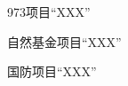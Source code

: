 
\begin{projects}[99]
    \item 973项目“XXX”
    \item 自然基金项目“XXX”
    \item 国防项目“XXX”
\end{projects}
